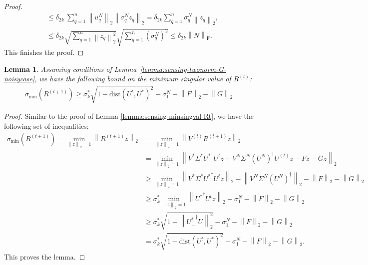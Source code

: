 \documentclass[11pt]{article}
\theoremstyle{plain}
\newtheorem{lemma}[theorem]{Lemma}
\theoremstyle{definition}
\newcommand{\Tr}{\operatorname{Tr}}
\newcommand{\dist}{\mathrm{dist}}
\newcommand{\frob}[1]{\left\| {#1} \right\|_\text{F}}
\newcommand{\twonorm}[1]{\left\| {#1} \right\|_2}
\newcommand{\Ut}{U^{t}}
\newcommand{\Rt}{R^{(t+1)}}
\newcommand{\So}{\Sigma^*}
\newcommand{\Uo}{U^*}
\newcommand{\Un}{U^N}
\newcommand{\Vn}{V^N}
\newcommand{\Sn}{\Sigma^N}
\newcommand{\sn}{\sigma^N}
\newcommand{\un}{u^N}
\newcommand{\so}{\sigma^*}
\begin{document}
\begin{proof}
\begin{align*}
  &\leq \delta_{2k} \ \sum_{q=1}^n \twonorm{\un_q} \twonorm{\sn_qz_q}= \delta_{2k} \sum_{q=1}^n \sn_q\twonorm{z_q},\\&\leq \delta_{2k} \sqrt{\sum_{q=1}^n \twonorm{z_q}^2} \sqrt{\sum_{q=1}^n (\sn_q)^2}\leq \delta_{2k} \frob{N}.
\end{align*}
This finishes the proof.
\end{proof}
\begin{lemma}\label{lemma:sensing-minsingval-Rt-noisycase}
Assuming conditions of Lemma~\ref{lemma:sensing-twonorm-G-noisycase}, we have the following bound on the minimum singular value of $R^{(t)}$:
\begin{align*}%
  \sigma_{\textrm{min}}\left(\Rt\right) \geq \so_k\sqrt{1-\dist(\Ut, \Uo)^2} - \sn_1 - \twonorm{F} - \twonorm{G}.
\end{align*}
\end{lemma}
\begin{proof}
  Similar to the proof of Lemma \ref{lemma:sensing-minsingval-Rt}, we have the following set of inequalities:
\begin{align*}
  \sigma_{\textrm{min}}\left(\Rt\right) = \min_{\twonorm{z}=1} \twonorm{\Rt z}
	&= \min_{\twonorm{z}=1} \twonorm{V^{(t)}\Rt z} \\
	&= \min_{\twonorm{z}=1} \twonorm{V^*\So{U^*}^\dag \Ut z + \Vn\Sn(\Un)^{\dag}U^{(t)} z - Fz - Gz} \\
	&\geq \min_{\twonorm{z}=1} \twonorm{V^*\So{U^*}^\dag \Ut z} - \twonorm{\Vn\Sn(\Un)^{\dag}} - \twonorm{F} - \twonorm{G} \\
	&\geq \so_k\min_{\twonorm{z}=1} \twonorm{{U^*}^\dag \Ut z} - \sn_1 - \twonorm{F} - \twonorm{G} \\
	&\geq \so_k\sqrt{1-\twonorm{{U_{\perp}^*}^\dag U}^2} - \sn_1 - \twonorm{F} - \twonorm{G} \\
	&= \so_k\sqrt{1-\dist(\Ut,\Uo)^2} - \sn_1 - \twonorm{F} - \twonorm{G}.
\end{align*}
This proves the lemma.
\end{proof}
\end{document}
